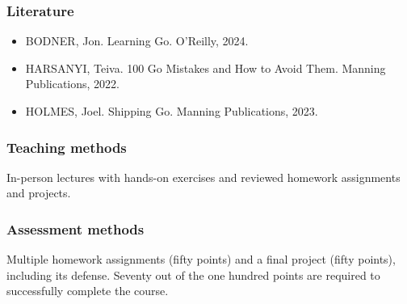 \documentclass[
  digital,
  color,
  oneside,
  nosansbold,
  nocolorbold,
  nolof,
  nolot,
]{fithesis4}
\begin{document}
\subsubsection{Literature}

\begin{itemize}
    \item BODNER, Jon. Learning Go. O’Reilly, 2024.\cite{learning-go}
    \item HARSANYI, Teiva. 100 Go Mistakes and How to Avoid Them. Manning Publications, 2022.\cite{100-go-mistakes}
    \item HOLMES, Joel. Shipping Go. Manning Publications, 2023.\cite{shipping-go}
\end{itemize}

\subsubsection{Teaching methods}

In-person lectures with hands-on exercises and reviewed homework assignments and projects.

\subsubsection{Assessment methods}

Multiple homework assignments (fifty points) and a final project (fifty points), including its defense. Seventy out of the one hundred points are required to successfully complete the course.
\end{document}
